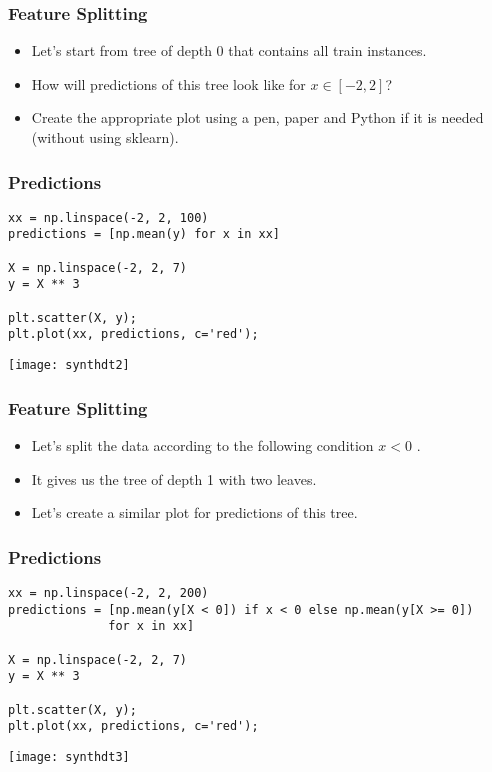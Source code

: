 \begin{frame}[fragile]\frametitle{Feature Splitting}	
\begin{itemize}
\item Let's start from tree of depth 0 that contains all train instances. 
\item How will predictions of this tree look like for $x \in [-2, 2]$? 
\item Create the appropriate plot using a pen, paper and Python if it is needed (without using sklearn).
\end{itemize}
\end{frame}


\begin{frame}[fragile]\frametitle{Predictions}	
\begin{lstlisting}
xx = np.linspace(-2, 2, 100)
predictions = [np.mean(y) for x in xx]

X = np.linspace(-2, 2, 7)
y = X ** 3

plt.scatter(X, y);
plt.plot(xx, predictions, c='red');
\end{lstlisting}
\begin{center}
\texttt{[image: synthdt2]}
\end{center}
\end{frame}

\begin{frame}[fragile]\frametitle{Feature Splitting}	
\begin{itemize}
\item Let's split the data according to the following condition  $x<0$ . 
\item It gives us the tree of depth 1 with two leaves. 
\item Let's create a similar plot for predictions of this tree.
\end{itemize}
\end{frame}

\begin{frame}[fragile]\frametitle{Predictions}	
\begin{lstlisting}
xx = np.linspace(-2, 2, 200)
predictions = [np.mean(y[X < 0]) if x < 0 else np.mean(y[X >= 0])
              for x in xx]

X = np.linspace(-2, 2, 7)
y = X ** 3

plt.scatter(X, y);
plt.plot(xx, predictions, c='red');
\end{lstlisting}
\begin{center}
\texttt{[image: synthdt3]}
\end{center}
\end{frame}


